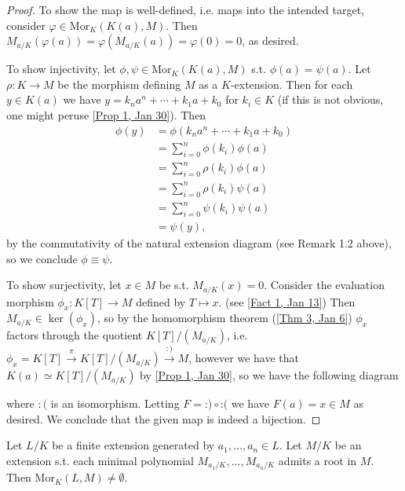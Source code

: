 \begin{proof}
To show the map is well-defined, i.e. maps into the intended target, consider $\varphi \in \text{Mor}_K(K(a), M)$. Then $M_{a/K}(\varphi(a)) = \varphi(M_{a/K}(a)) = \varphi(0) = 0$, as desired.

To show injectivity, let $\phi, \psi \in \text{Mor}_K(K(a), M)$ s.t. $\phi(a) = \psi(a)$. Let $\rho \colon K \rightarrow M$ be the morphism defining $M$ as a $K$-extension. Then for each $y \in K(a)$ we have $y = k_na^n + \cdots + k_1a + k_0$ for $k_i \in K$ (if this is not obvious, one might peruse \ref{Prop 1, Jan 30}). Then
\begin{align*}
\phi(y) &= \phi(k_na^n + \cdots + k_1a + k_0) \\
&= \sum_{i = 0}^n \phi(k_i) \phi(a) \\
&= \sum_{i = 0}^n \rho(k_i) \phi(a) \\
&= \sum_{i = 0}^n \rho(k_i) \psi(a) \\
&= \sum_{i = 0}^n \psi(k_i) \psi(a) \\
&= \psi(y),
\end{align*}
by the commutativity of the natural extension diagram (see Remark 1.2 above), so we conclude $\phi \equiv \psi$.

To show surjectivity, let $x \in M$ be s.t. $M_{a/K}(x) = 0$. Consider the evaluation morphism $\phi_x \colon K[T] \rightarrow M$ defined by $T \mapsto x$. (see \ref{Fact 1, Jan 13}) Then $M_{a/K} \in \ker(\phi_x)$, so by the homomorphism theorem (\ref{Thm 3, Jan 6}) $\phi_x$ factors through the quotient $K[T]/(M_{a/K})$, i.e. $\phi_x = K[T] \stackrel{\pi}{\rightarrow} K[T]/(M_{a/K}) \stackrel{:)}{\rightarrow} M$, however we have that $K(a) \simeq K[T]/(M_{a/K})$ by \ref{Prop 1, Jan 30}, so we have the following diagram
\begin{center}
\end{center}
where $:($ is an isomorphism. Letting $F = \text{:)} \circ \text{:(}$ we have $F(a) = x \in M$ as desired. We conclude that the given map is indeed a bijection.
\end{proof}

\begin{cor} \label{Cor 5, Feb 6}
Let $L/K$ be a finite extension generated by $a_1, ..., a_n \in L$. Let $M/K$ be an extension s.t. each minimal polynomial $M_{a_1/K}, ..., M_{a_n/K}$ admits a root in $M$. Then Mor$_K(L, M) \neq \emptyset$.
\end{cor}

